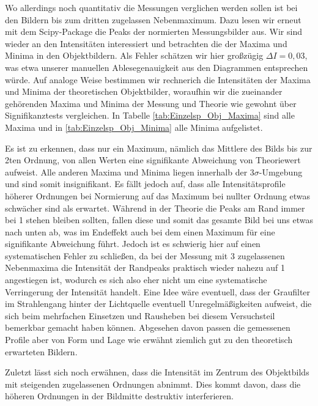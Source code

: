 \documentclass{article}
\begin{document}
Wo allerdings noch quantitativ die Messungen verglichen werden sollen ist bei den Bildern bis zum dritten zugelassen Nebenmaximum. Dazu lesen wir erneut mit dem Scipy-Package die Peaks der normierten Messungsbilder aus. Wir sind wieder an den Intensitäten interessiert und betrachten die der Maxima und Minima in den Objektbildern. Als Fehler schätzen wir hier großzügig $\Delta I = 0,03$, was etwa unserer manuellen Ablesegenauigkeit aus den Diagrammen entsprechen würde. Auf analoge Weise bestimmen wir rechnerich die Intensitäten der Maxima und Minima der theoretischen Objektbilder, woraufhin wir die zueinander gehörenden Maxima und Minima der Messung und Theorie wie gewohnt über Signifikanztests vergleichen. In Tabelle \ref{tab:Einzelsp_Obj_Maxima} sind alle Maxima und in \ref{tab:Einzelsp_Obj_Minima} alle Minima aufgelistet.  

Es ist zu erkennen, dass nur ein Maximum, nämlich das Mittlere des Bilds bis zur 2ten Ordnung, von allen Werten eine signifikante Abweichung von Theoriewert aufweist. Alle anderen Maxima und Minima liegen innerhalb der $3\sigma$-Umgebung und sind somit insignifikant. Es fällt jedoch auf, dass alle Intensitätsprofile höherer Ordnungen bei Normierung auf das Maximum bei nullter Ordnung etwas schwächer sind als erwartet. Während in der Theorie die Peaks am Rand immer bei 1 stehen bleiben sollten, fallen diese und somit das gesamte Bild bei uns etwas nach unten ab, was im Endeffekt auch bei dem einen Maximum für eine signifikante Abweichung führt. Jedoch ist es schwierig hier auf einen systematischen Fehler zu schließen, da bei der Messung mit 3 zugelassenen Nebenmaxima die Intensität der Randpeaks praktisch wieder nahezu auf 1 angestiegen ist, wodurch es sich also eher nicht um eine systematische Verringerung der Intensität handelt. Eine Idee wäre eventuell, dass der Graufilter im Strahlengang hinter der Lichtquelle eventuell Unregelmäßigkeiten aufweist, die sich beim mehrfachen Einsetzen und Rausheben bei diesem Versuchsteil bemerkbar gemacht haben können. Abgesehen davon passen die gemessenen Profile aber von Form und Lage wie erwähnt ziemlich gut zu den theoretisch erwarteten Bildern.  

Zuletzt lässt sich noch erwähnen, dass die Intensität im Zentrum des Objektbilds mit steigenden zugelassenen Ordnungen abnimmt. Dies kommt davon, dass die höheren Ordnungen in der Bildmitte destruktiv interferieren.
\end{document}
